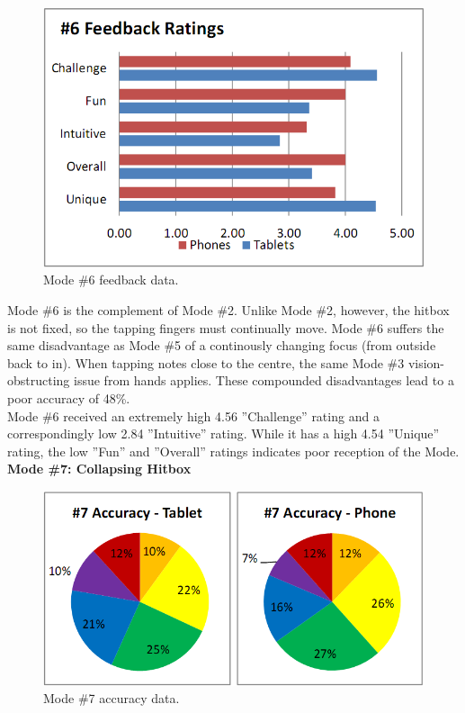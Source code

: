 \documentclass{sig-alternate}
\begin{document}
\begin{figure}[htb!]
	\begin{center}
		\includegraphics[width=1\linewidth]{figure_chart_rating_6}
	\end{center}
	\vspace{-12pt}
	\caption{Mode \#6 feedback data.}
	\label{fig:chart_rating_6}
\end{figure}

Mode \#6  is the complement of Mode \#2. Unlike Mode \#2, however, the hitbox is not fixed, so the tapping fingers must continually move. Mode \#6 suffers the same disadvantage as Mode \#5 of a continously changing focus (from outside back to in). When tapping notes close to the centre, the same Mode \#3 vision-obstructing issue from hands applies. These compounded disadvantages lead to a poor accuracy of 48\%. \\

Mode \#6 received an extremely high 4.56 ''Challenge'' rating and a correspondingly low 2.84 ''Intuitive'' rating. While it has a high 4.54 ''Unique'' rating, the low ''Fun'' and ''Overall'' ratings indicates poor reception of the Mode. \\

\newpage
\noindent \textbf{Mode \#7: Collapsing Hitbox}

\begin{figure}[htb!]
	\begin{center}
		\includegraphics[width=1\linewidth]{figure_chart_accuracy_7}
	\end{center}
	\vspace{-12pt}
	\caption{Mode \#7 accuracy data.}
	\label{fig:chart_accuracy_7}
\end{figure}
\end{document}
